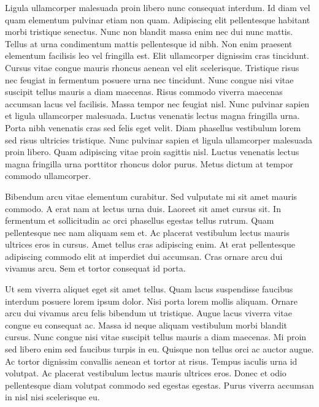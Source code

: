 Ligula ullamcorper malesuada proin libero nunc consequat interdum.
Id diam vel quam elementum pulvinar etiam non quam. Adipiscing elit
pellentesque habitant morbi tristique senectus. Nunc non blandit massa
enim nec dui nunc mattis. Tellus at urna condimentum mattis pellentesque
id nibh. Non enim praesent elementum facilisis leo vel fringilla est.
Elit ullamcorper dignissim cras tincidunt. Cursus vitae congue mauris
rhoncus aenean vel elit scelerisque. Tristique risus nec feugiat in
fermentum posuere urna nec tincidunt. Nunc congue nisi vitae suscipit
tellus mauris a diam maecenas. Risus commodo viverra maecenas accumsan
lacus vel facilisis. Massa tempor nec feugiat nisl. Nunc pulvinar
sapien et ligula ullamcorper malesuada. Luctus venenatis lectus magna
fringilla urna. Porta nibh venenatis cras sed felis eget velit. Diam
phasellus vestibulum lorem sed risus ultricies tristique. Nunc pulvinar
sapien et ligula ullamcorper malesuada proin libero. Quam adipiscing
vitae proin sagittis nisl. Luctus venenatis lectus magna fringilla
urna porttitor rhoncus dolor purus. Metus dictum at tempor commodo
ullamcorper.

Bibendum arcu vitae elementum curabitur. Sed vulputate mi sit amet
mauris commodo. A erat nam at lectus urna duis. Laoreet sit amet cursus
sit. In fermentum et sollicitudin ac orci phasellus egestas tellus
rutrum. Quam pellentesque nec nam aliquam sem et. Ac placerat vestibulum
lectus mauris ultrices eros in cursus. Amet tellus cras adipiscing
enim. At erat pellentesque adipiscing commodo elit at imperdiet dui
accumsan. Cras ornare arcu dui vivamus arcu. Sem et tortor consequat
id porta.

Ut sem viverra aliquet eget sit amet tellus. Quam lacus suspendisse
faucibus interdum posuere lorem ipsum dolor. Nisi porta lorem mollis
aliquam. Ornare arcu dui vivamus arcu felis bibendum ut tristique.
Augue lacus viverra vitae congue eu consequat ac. Massa id neque aliquam
vestibulum morbi blandit cursus. Nunc congue nisi vitae suscipit tellus
mauris a diam maecenas. Mi proin sed libero enim sed faucibus turpis
in eu. Quisque non tellus orci ac auctor augue. Ac tortor dignissim
convallis aenean et tortor at risus. Tempus iaculis urna id volutpat.
Ac placerat vestibulum lectus mauris ultrices eros. Donec et odio
pellentesque diam volutpat commodo sed egestas egestas. Purus viverra
accumsan in nisl nisi scelerisque eu.


